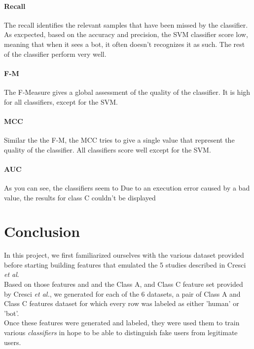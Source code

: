 \documentclass[a4paper,11pt]{article}
\begin{document}
	\paragraph{Recall}
	The recall identifies the relevant samples that have been missed by the classifier. As excpected, based on the accuracy and precision, the SVM classifier score low, meaning that when it sees a bot, it often doesn't recognizes it as such. The rest of the classifier perform very well.
	
	
	\paragraph{F-M}
	The F-Measure gives a global assessment of the quality of the classifier. It is high for all classifiers, except for the SVM.
	
	\paragraph{MCC}
	Similar the the F-M, the MCC tries to give a single value that represent the quality of the classifier. All classifiers score well except for the SVM.	
	\paragraph{AUC}
	
	As you can see, the classifiers seem to 
	Due to an execution error caused by a bad value, the results for class C couldn't be displayed
	
\section{Conclusion}
In this project, we first familiarized ourselves with the various dataset provided before starting building features that emulated the 5 studies described in Cresci \textit{et al}. \\
Based on those features and and the Class A, and Class C feature set provided by Cresci \textit{et al.}, we generated for each of the 6 datasets, a pair of Class A and Class C features dataset for which every row was labeled as either 'human' or 'bot'.\\
Once these features were generated and labeled, they were used them to train various \textit{classifiers} in hope to be able to distinguish fake users from legitimate users.



\end{document}
